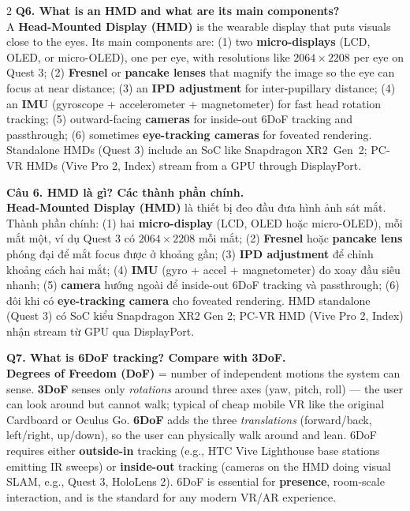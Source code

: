 \begin{paracol}{2}
\textbf{Q6. What is an HMD and what are its main components?}\\
A \textbf{Head-Mounted Display (HMD)} is the wearable display that puts visuals close to the eyes. Its main components are: (1) two \textbf{micro-displays} (LCD, OLED, or micro-OLED), one per eye, with resolutions like $2064\times2208$ per eye on Quest 3; (2) \textbf{Fresnel} or \textbf{pancake lenses} that magnify the image so the eye can focus at near distance; (3) an \textbf{IPD adjustment} for inter-pupillary distance; (4) an \textbf{IMU} (gyroscope + accelerometer + magnetometer) for fast head rotation tracking; (5) outward-facing \textbf{cameras} for inside-out 6DoF tracking and passthrough; (6) sometimes \textbf{eye-tracking cameras} for foveated rendering. Standalone HMDs (Quest 3) include an SoC like Snapdragon XR2~Gen~2; PC-VR HMDs (Vive Pro 2, Index) stream from a GPU through DisplayPort.

\switchcolumn

\textbf{Câu 6. HMD là gì? Các thành phần chính.}\\
\textbf{Head-Mounted Display (HMD)} là thiết bị đeo đầu đưa hình ảnh sát mắt. Thành phần chính: (1) hai \textbf{micro-display} (LCD, OLED hoặc micro-OLED), mỗi mắt một, ví dụ Quest 3 có $2064\times2208$ mỗi mắt; (2) \textbf{Fresnel} hoặc \textbf{pancake lens} phóng đại để mắt focus được ở khoảng gần; (3) \textbf{IPD adjustment} để chỉnh khoảng cách hai mắt; (4) \textbf{IMU} (gyro + accel + magnetometer) đo xoay đầu siêu nhanh; (5) \textbf{camera} hướng ngoài để inside-out 6DoF tracking và passthrough; (6) đôi khi có \textbf{eye-tracking camera} cho foveated rendering. HMD standalone (Quest 3) có SoC kiểu Snapdragon XR2 Gen 2; PC-VR HMD (Vive Pro 2, Index) nhận stream từ GPU qua DisplayPort.

\switchcolumn*

\textbf{Q7. What is 6DoF tracking? Compare with 3DoF.}\\
\textbf{Degrees of Freedom (DoF)} = number of independent motions the system can sense. \textbf{3DoF} senses only \textit{rotations} around three axes (yaw, pitch, roll) --- the user can look around but cannot walk; typical of cheap mobile VR like the original Cardboard or Oculus Go. \textbf{6DoF} adds the three \textit{translations} (forward/back, left/right, up/down), so the user can physically walk around and lean. 6DoF requires either \textbf{outside-in} tracking (e.g., HTC Vive Lighthouse base stations emitting IR sweeps) or \textbf{inside-out} tracking (cameras on the HMD doing visual SLAM, e.g., Quest 3, HoloLens 2). 6DoF is essential for \textbf{presence}, room-scale interaction, and is the standard for any modern VR/AR experience.


\end{paracol}
